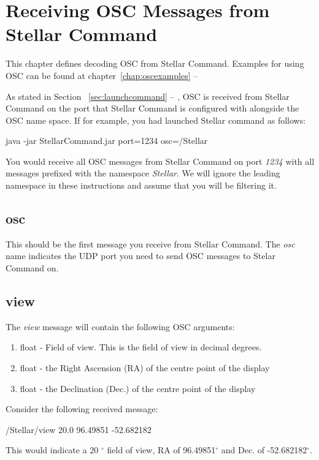 \chapter{Receiving OSC Messages from Stellar Command}
This chapter defines decoding OSC from Stellar Command.  Examples for using OSC can be found at 
chapter~\ref{chap:oscexamples} --
\emph{}


As stated in Section ~\ref{sec:launchcommand} --
\emph{}, OSC is received from Stellar Command on the port that Stellar Command is configured with alongside the OSC name space. If for example, you had launched Stellar command as follows:
\begin{syntax}
	\medskip
	java -jar StellarCommand.jar port=1234 osc=/Stellar  \\
	\medskip
\end{syntax}

You would receive all OSC messages from Stellar Command on port \textit{1234} with all messages prefixed with the namespace \textit{Stellar}. We will ignore the leading namespace in these instructions and assume that you will be filtering it.

\section{osc}
This should be the first message you receive from Stellar Command. The \textit{osc} name indicates the UDP port you need to send OSC messages to Stelar Command on.

\section{view}
The \textit{view} message will contain the following OSC arguments:
\begin{enumerate}
	\item float - Field of view. This is the field of view in decimal degrees. 
	\item float - the Right Ascension (RA) of the centre point of the display
	\item float - the Declination (Dec.) of the centre point of the display
\end{enumerate}
Consider the following received message:
\begin{syntax}
	/Stellar/view 20.0 96.49851 -52.682182  \\
\end{syntax}
\bigskip
This would indicate a 20 $^{\circ}$ field of view, RA of 96.49851$^{\circ}$ and Dec. of -52.682182$^{\circ}$.

